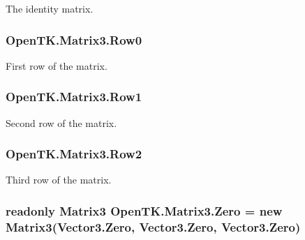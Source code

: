The identity matrix. 

\hypertarget{struct_open_t_k_1_1_matrix3_a0e9a63d9e068334a8a59b7ef11f04a04}{
\subsubsection[{Row0}]{ Open\-T\-K.\-Matrix3.\-Row0}}\label{struct_open_t_k_1_1_matrix3_a0e9a63d9e068334a8a59b7ef11f04a04}


First row of the matrix. 

\hypertarget{struct_open_t_k_1_1_matrix3_a3b1b4bd41092d6345c5275c8fd4eb236}{
\subsubsection[{Row1}]{ Open\-T\-K.\-Matrix3.\-Row1}}\label{struct_open_t_k_1_1_matrix3_a3b1b4bd41092d6345c5275c8fd4eb236}


Second row of the matrix. 

\hypertarget{struct_open_t_k_1_1_matrix3_ab9641e83181cc566159d3f2e033f1e5b}{
\subsubsection[{Row2}]{ Open\-T\-K.\-Matrix3.\-Row2}}\label{struct_open_t_k_1_1_matrix3_ab9641e83181cc566159d3f2e033f1e5b}


Third row of the matrix. 

\hypertarget{struct_open_t_k_1_1_matrix3_a489c0a09a7421745801996dff0fd490b}{
\subsubsection[{Zero}]{\setlength{\rightskip}{0pt plus 5cm}readonly {\bf Matrix3} Open\-T\-K.\-Matrix3.\-Zero = new {\bf Matrix3}(Vector3.\-Zero, Vector3.\-Zero, Vector3.\-Zero)\hspace{0.3cm}{\ttfamily [static]}}}\label{struct_open_t_k_1_1_matrix3_a489c0a09a7421745801996dff0fd490b}


